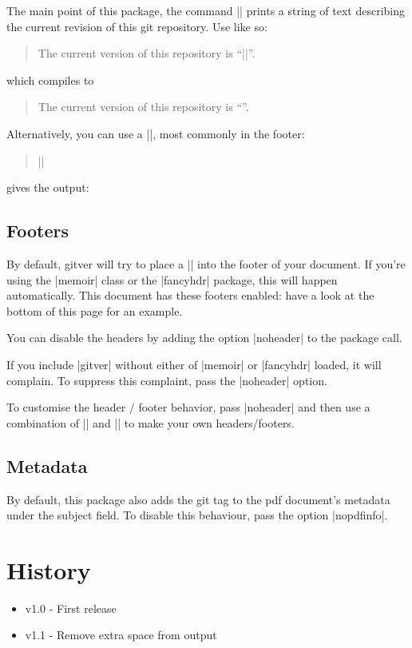 \documentclass[a4paper]{ltxdoc}
\begin{document}

\DescribeMacro{\gitVer}
%
The main point of this package, the command |\gitVer| prints a string of text
describing the current revision of this git repository. Use like so:
\begin{quote}
	The current version of this repository is ``|\gitVer{}|''.
\end{quote}
which compiles to
\begin{quote}
	The current version of this repository is ``\gitVer{}''.
\end{quote}

\DescribeMacro{\versionBox}
Alternatively, you can use a |\versionBox|, most commonly in the footer:
\begin{quote}
	|\versionBox{}|
\end{quote}
%
gives the output:
\vspace{3mm}

\versionBox{}

\subsection{Footers} %
\label{sub:footers}

By default, \textsf{gitver} will try to place a |\versionBox| into the footer of
your document. If you're using the |memoir| class or the |fancyhdr| package,
this will happen automatically. This document has these footers enabled: have a
look at the bottom of this page for an example. 

You can disable the headers by adding the option |noheader| to the package call. 

If you include |gitver| without either of |memoir| or |fancyhdr| loaded, it will
complain. To suppress this complaint, pass the |noheader| option. 

To customise the header / footer behavior, pass |noheader| and then use a
combination of |\versionBox| and |\gitVer| to make your own headers/footers. 


\subsection{Metadata} %
\label{sub:metadata}

 By default, this package also adds the git tag to the
pdf document's metadata under the subject field. To disable this behaviour, pass
the option |nopdfinfo|. 


\section{History}

\begin{itemize}
	\item v1.0 - First release
	\item v1.1 - Remove extra space from output
\end{itemize}
\end{document}
